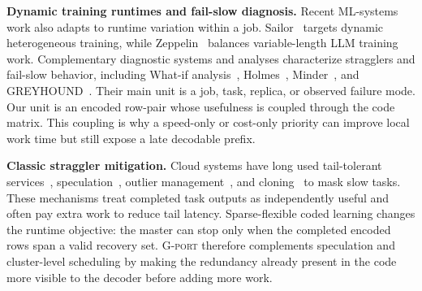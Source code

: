 \textbf{Dynamic training runtimes and fail-slow diagnosis.}
Recent ML-systems work also adapts to runtime variation within a job.
Sailor~\cite{strati2025sailor} targets dynamic heterogeneous training, while
Zeppelin~\cite{chen2026zeppelin} balances variable-length LLM training work.
Complementary diagnostic systems and analyses characterize stragglers and
fail-slow behavior, including What-if analysis~\cite{lin2025whatifstragglers},
Holmes~\cite{yao2025holmes}, Minder~\cite{deng2025minder}, and
GREYHOUND~\cite{wu2025greyhound}.  Their main unit is a job, task, replica, or
observed failure mode.  Our unit is an encoded row-pair whose usefulness is
coupled through the code matrix.  This coupling is why a speed-only or
cost-only priority can improve local work time but still expose a late
decodable prefix.

\textbf{Classic straggler mitigation.}
Cloud systems have long used tail-tolerant services~\cite{dean2013tail},
speculation~\cite{zaharia2008late}, outlier management~\cite{ananthanarayanan2010mantri},
and cloning~\cite{ananthanarayanan2013dolly} to mask slow tasks.  These
mechanisms treat completed task outputs as independently useful and often pay
extra work to reduce tail latency.  Sparse-flexible coded learning changes the
runtime objective: the master can stop only when the completed encoded rows
span a valid recovery set.  \textsc{G-port} therefore complements speculation and
cluster-level scheduling by making the redundancy already present in the code
more visible to the decoder before adding more work.
